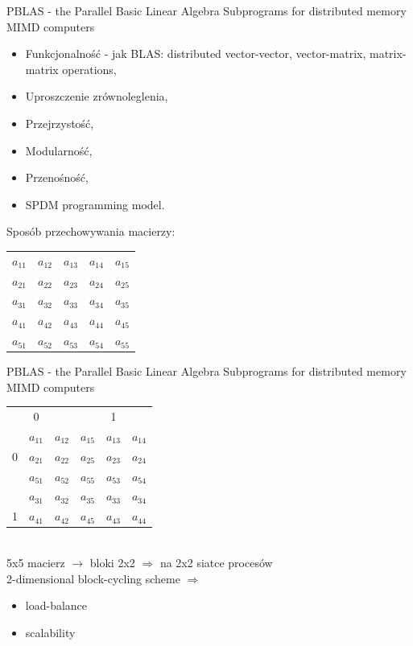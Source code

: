 	\begin{frame}{PBLAS - the Parallel Basic Linear Algebra Subprograms for distributed memory MIMD computers}
		\begin{itemize}
			\item Funkcjonalność - jak BLAS: distributed vector-vector, vector-matrix, matrix-matrix operations,
			\item Uproszczenie zrównoleglenia,
			\item Przejrzystość,
			\item Modularność,
			\item Przenośność,
			\item SPDM programming model.
		\end{itemize}
		Sposób przechowywania macierzy:
		\begin{tabular}{ l l | l l | l }
		$a_{11}$ & $a_{12}$ & $a_{13}$ & $a_{14}$ & $a_{15}$ \\
		$a_{21}$ & $a_{22}$ & $a_{23}$ & $a_{24}$ & $a_{25}$ \\
		\hline
		$a_{31}$ & $a_{32}$ & $a_{33}$ & $a_{34}$ & $a_{35}$ \\
		$a_{41}$ & $a_{42}$ & $a_{43}$ & $a_{44}$ & $a_{45}$ \\
		\hline
		$a_{51}$ & $a_{52}$ & $a_{53}$ & $a_{54}$ & $a_{55}$ \\
		\end{tabular}
	\end{frame}
	\begin{frame}{PBLAS - the Parallel Basic Linear Algebra Subprograms for distributed memory MIMD computers}
		\begin{tabular}{ c | c c c | c c | }
			\multicolumn{1}{c}{} & \multicolumn{1}{c}{0} & \multicolumn{1}{c}{} & \multicolumn{1}{c}{} & \multicolumn{1}{c}{1} \\
		\cline{2-6} & $a_{11}$ & $a_{12}$ & $a_{15}$ & $a_{13}$ & $a_{14}$ \\
		0 & $a_{21}$ & $a_{22}$ & $a_{25}$ & $a_{23}$ & $a_{24}$ \\
		 & $a_{51}$ & $a_{52}$ & $a_{55}$ & $a_{53}$ & $a_{54}$ \\
	
		\cline{2-6} & $a_{31}$ & $a_{32}$ & $a_{35}$ & $a_{33}$ & $a_{34}$ \\
		1& $a_{41}$ & $a_{42}$ & $a_{45}$ & $a_{43}$ & $a_{44}$ \\
		\cline{2-6}
		
		\end{tabular} \\
		\vspace{5mm}
		5x5  macierz $\rightarrow$ bloki 2x2 $\Rightarrow$ na 2x2 siatce procesów \\
		2-dimensional block-cycling scheme $\Rightarrow$ \\
		\begin{itemize}
			\item load-balance
			\item scalability
		\end{itemize}
	\end{frame}
	
